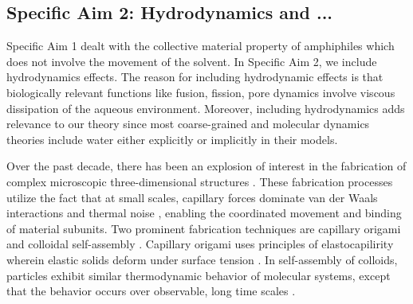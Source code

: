 \subsection{Specific Aim 2: Hydrodynamics and ...}
\label{subsec:specific_aim_2}
Specific Aim 1 dealt with the collective material property of amphiphiles which does not involve the movement  of the solvent.
In Specific Aim 2, we include hydrodynamics effects. The reason for including hydrodynamic effects is that 
biologically relevant functions like fusion, fission, pore dynamics involve viscous dissipation of the aqueous environment. 
Moreover, including hydrodynamics adds relevance to our theory since most coarse-grained and molecular dynamics theories
include water either explicitly or implicitly in their models. 


%
Over the past decade, there has been an explosion of interest in the fabrication of complex microscopic three-dimensional structures 
\cite{Cho2010}. These fabrication processes utilize the fact that at small scales, capillary forces dominate  van der Waals interactions and thermal noise  \cite{Zhang2017}, enabling the coordinated movement and binding of material subunits. Two prominent fabrication techniques are capillary origami 
\cite{Pandey2011,Leong2007,Reynolds2019} and colloidal self-assembly \cite{Dasgupta2017,Siontorou2017}. Capillary origami uses principles of elastocapilirity wherein elastic solids deform under surface tension \cite{Bico2018,VanHonschoten2010}. In self-assembly of colloids, 
particles exhibit similar thermodynamic behavior of molecular systems, except that the behavior occurs over observable, long time scales \cite{Zhang2017}. 

